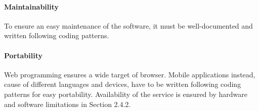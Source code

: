 \paragraph{Maintainability}
To ensure an easy maintenance of the software, it must be well-documented and written following coding patterns.
\paragraph{Portability}
Web programming ensures a wide target of browser. Mobile applications instead, cause of different languages and devices, have to be written following coding patterns for easy portability.
Availability of the service is ensured by hardware and software limitations in Section 2.4.2.

